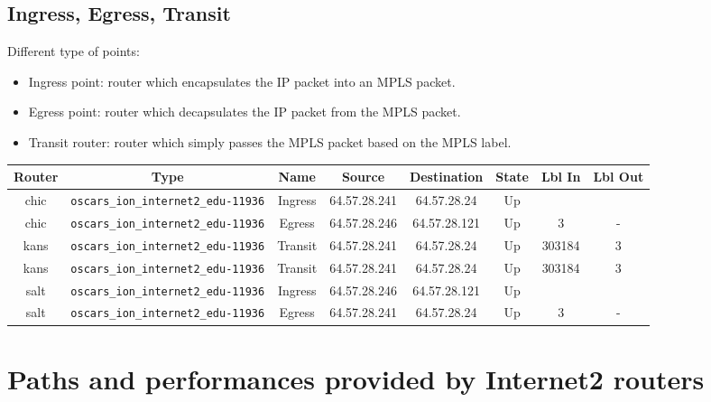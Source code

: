 \documentclass[usenames,dvipsnames]{beamer}
\begin{document}
\subsection{Ingress, Egress, Transit}
\begin{frame}[fragile]{\insertsubsection}
Different type of points:
\begin{itemize}
	\item Ingress point: router which encapsulates the IP packet into an MPLS packet.
    \item Egress point: router which decapsulates the IP packet from the MPLS packet.
    \item Transit router: router which simply passes the MPLS packet based on the MPLS label.
\end{itemize}

{\tiny
\hspace*{-.2cm}
\begin{tabular}{|cccccccc|}\hline
Router & Type & Name & Source & Destination & State & Lbl In & Lbl Out\\
\hline
chic & \texttt{oscars\_ion\_internet2\_edu-11936} & Ingress & 64.57.28.241 & 64.57.28.24 & Up & & \\
chic & \texttt{oscars\_ion\_internet2\_edu-11936} & Egress & 64.57.28.246 & 64.57.28.121 & Up & 3 &	- \\
kans & \texttt{oscars\_ion\_internet2\_edu-11936} & Transit & 64.57.28.241 & 64.57.28.24 & Up & 303184 & 3\\
kans & \texttt{oscars\_ion\_internet2\_edu-11936} & Transit & 64.57.28.241 & 64.57.28.24 & Up & 303184 & 3\\
salt & \texttt{oscars\_ion\_internet2\_edu-11936} & Ingress & 64.57.28.246 & 64.57.28.121 & Up & &\\
salt & \texttt{oscars\_ion\_internet2\_edu-11936} & Egress & 64.57.28.241 & 64.57.28.24 & Up & 3 & -\\
\hline
\end{tabular}
}

\end{frame}



\section{Paths and performances provided by Internet2 routers}
\end{document}
